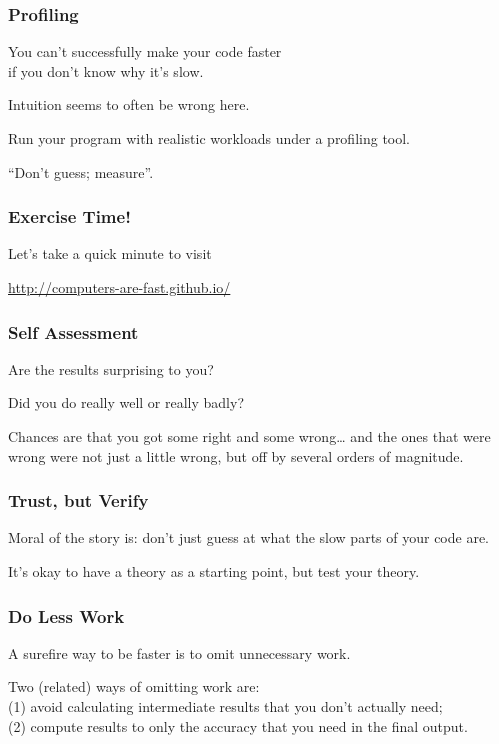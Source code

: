 \begin{frame}
\frametitle{Profiling}
\Large

You can't successfully make your code faster \\
if you don't know why it's slow. 

Intuition seems to often be
wrong here. 

Run your program with realistic workloads under a profiling tool.

``Don't guess; measure''.

\end{frame}


\begin{frame}
\frametitle{Exercise Time!}

\Large
Let's take a quick minute to visit \\
\begin{center}
\large
\vspace*{-4em}
\url{http://computers-are-fast.github.io/}
\end{center}

\end{frame}

\begin{frame}
\frametitle{Self Assessment}

\Large
Are the results surprising to you? 

Did you do really well or really badly? 

Chances are that you got some right and some wrong\ldots
and the ones that were wrong were not just a little wrong, but off by several orders of magnitude. 
\end{frame}

\begin{frame}
\frametitle{Trust, but Verify}
\Large
Moral of the story is: don't just guess at what the slow parts of your code are. 

It's okay to have a theory as a starting point, but test your theory.

\end{frame}

\begin{frame}
\Large
\frametitle{Do Less Work}

A surefire way to be faster is to omit unnecessary
work. 

Two (related) ways of omitting work are:\\
\quad (1) avoid calculating intermediate results that you don't actually need;\\
\quad (2) compute results to only the accuracy that you need in the final output.


\end{frame}

